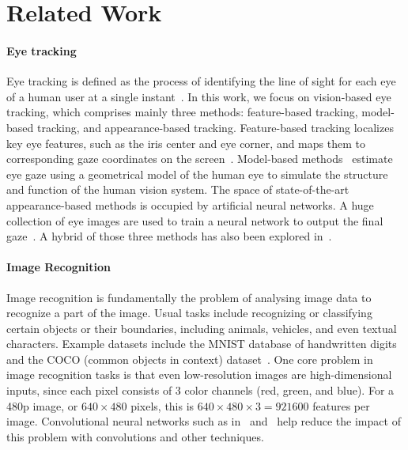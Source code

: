 \section{Related Work}

\paragraph{Eye tracking}

Eye tracking is defined as the process of identifying the line of sight for each
eye of a human user at a single instant~\cite{kim2019nvgaze}. In this work, we
focus on vision-based eye tracking, which comprises mainly three methods:
feature-based tracking, model-based tracking, and appearance-based tracking.
Feature-based tracking localizes key eye features, such as the iris center and
eye corner, and maps them to corresponding gaze coordinates on the
screen~\cite{sesma2012evaluation, torricelli2008neural}. Model-based
methods~\cite{wood20163d, wang2017real} estimate eye gaze using a geometrical
model of the human eye to simulate the structure and function of the human
vision system. The space of state-of-the-art appearance-based methods is
occupied by artificial neural networks. A huge collection of eye images are used
to train a neural network to output the final gaze~\cite{zhang2015appearance,
schneider2014manifold, sugano2014learning}. A hybrid of those three methods has
also been explored in~\cite{kim2019nvgaze, wang2018hierarchical}.

\paragraph{Image Recognition}

Image recognition is fundamentally the problem of analysing image data to
recognize a part of the image. Usual tasks include recognizing or classifying
certain objects or their boundaries, including animals, vehicles, and even
textual characters. Example datasets include the MNIST database of handwritten
digits~\cite{Lecun_1998} and the COCO (common objects in context)
dataset~\cite{COCO}. One core problem in image recognition tasks is that even
low-resolution images are high-dimensional inputs, since each pixel consists of
3 color channels (red, green, and blue). For a 480p image, or \(640 \times 480\)
pixels, this is \(640 \times 480 \times 3 = 921600\) features per image.
Convolutional neural networks such as in~\cite{Lecun_1998}
and~\cite{Krizhevsky_2017} help reduce the impact of this problem with
convolutions and other techniques.

